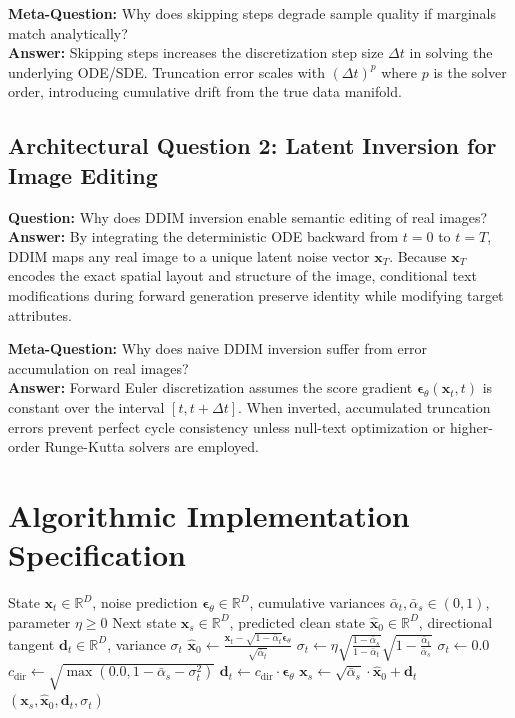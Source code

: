 \documentclass[11pt,a4paper]{article}
\theoremstyle{definition}
\begin{document}
\textbf{Meta-Question:} Why does skipping steps degrade sample quality if marginals match analytically?\\
\textbf{Answer:} Skipping steps increases the discretization step size $\Delta t$ in solving the underlying ODE/SDE. Truncation error scales with $(\Delta t)^p$ where $p$ is the solver order, introducing cumulative drift from the true data manifold.

\subsection{Architectural Question 2: Latent Inversion for Image Editing}
\textbf{Question:} Why does DDIM inversion enable semantic editing of real images?\\
\textbf{Answer:} By integrating the deterministic ODE backward from $t = 0$ to $t = T$, DDIM maps any real image to a unique latent noise vector $\mathbf{x}_T$. Because $\mathbf{x}_T$ encodes the exact spatial layout and structure of the image, conditional text modifications during forward generation preserve identity while modifying target attributes.

\textbf{Meta-Question:} Why does naive DDIM inversion suffer from error accumulation on real images?\\
\textbf{Answer:} Forward Euler discretization assumes the score gradient $\boldsymbol{\epsilon}_\theta(\mathbf{x}_t, t)$ is constant over the interval $[t, t+\Delta t]$. When inverted, accumulated truncation errors prevent perfect cycle consistency unless null-text optimization or higher-order Runge-Kutta solvers are employed.

\section{Algorithmic Implementation Specification}

\begin{algorithm}[H]
\caption{Deterministic DDIM Step Integration}
\begin{algorithmic}[1]
\Require State $\mathbf{x}_t \in \mathbb{R}^D$, noise prediction $\boldsymbol{\epsilon}_\theta \in \mathbb{R}^D$, cumulative variances $\bar{\alpha}_t, \bar{\alpha}_s \in (0, 1)$, parameter $\eta \ge 0$
\Ensure Next state $\mathbf{x}_s \in \mathbb{R}^D$, predicted clean state $\hat{\mathbf{x}}_0 \in \mathbb{R}^D$, directional tangent $\mathbf{d}_t \in \mathbb{R}^D$, variance $\sigma_t$
\State $\hat{\mathbf{x}}_0 \gets \frac{\mathbf{x}_t - \sqrt{1 - \bar{\alpha}_t}\boldsymbol{\epsilon}_\theta}{\sqrt{\bar{\alpha}_t}}$
    \State $\sigma_t \gets \eta \sqrt{\frac{1 - \bar{\alpha}_s}{1 - \bar{\alpha}_t}} \sqrt{1 - \frac{\bar{\alpha}_t}{\bar{\alpha}_s}}$
\Else
    \State $\sigma_t \gets 0.0$
\EndIf
\State $c_{\text{dir}} \gets \sqrt{\max(0.0, 1 - \bar{\alpha}_s - \sigma_t^2)}$
\State $\mathbf{d}_t \gets c_{\text{dir}} \cdot \boldsymbol{\epsilon}_\theta$
\State $\mathbf{x}_s \gets \sqrt{\bar{\alpha}_s} \cdot \hat{\mathbf{x}}_0 + \mathbf{d}_t$
\State \Return $(\mathbf{x}_s, \hat{\mathbf{x}}_0, \mathbf{d}_t, \sigma_t)$
\end{algorithmic}
\end{algorithm}
\end{document}
